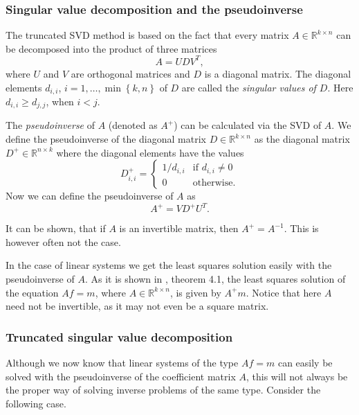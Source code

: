 \documentclass[12pt,a4]{article}
\newcommand{\R}{{\mathbb R}}
\begin{document}
\subsubsection{Singular value decomposition and the pseudoinverse}
\label{sec:svd}

The truncated SVD method is based on the fact that every matrix $A \in \R^{k \times n}$ can be decomposed into the product of three matrices
\begin{equation}
A = U D V^T,
\end{equation}
where $U$ and $V$ are orthogonal matrices and $D$ is a diagonal matrix. The diagonal elements $d_{i,i}$, $i = 1, \ldots , \min \left\{ k,n \right\}$ of $D$ are called the \emph{singular values of $D$}. Here $d_{i,i} \geq d_{j,j}$, when $i < j$.

The \emph{pseudoinverse} of $A$ (denoted as $A^+$) can be calculated via the SVD of $A$. We define the pseudoinverse of the diagonal matrix $D \in \R^{k \times n}$ as the diagonal matrix $D^+ \in \R^{n \times k}$ where the diagonal elements have the values
\begin{equation}
D^+_{i,i} =
\begin{cases}
    1 / d_{i,i} & \text{if }d_{i,i} \neq 0 \\
    0           & \text{otherwise}.
\end{cases}
\end{equation}
Now we can define the pseudoinverse of $A$ as 
\begin{equation}\label{pseudo}
A^+ = V D^+ U^T .
\end{equation}

It can be shown, that if $A$ is an invertible matrix, then $A^+ = A^{-1}$. This is however often not the case.

In the case of linear systems we get the least squares solution easily with the pseudoinverse of $A$. As it is shown in \cite{samu}, theorem 4.1, the least squares solution of the equation $Af = m$, where $A \in \R^{k \times n}$, is given by $A^+ m$. Notice that here $A$ need not be invertible, as it may not even be a square matrix.

\subsubsection{Truncated singular value decomposition}

Although we now know that linear systems of the type $Af = m$ can easily be solved with the pseudoinverse of the coefficient matrix $A$, this will not always be the proper way of solving inverse problems of the same type. Consider the following case.
\end{document}
